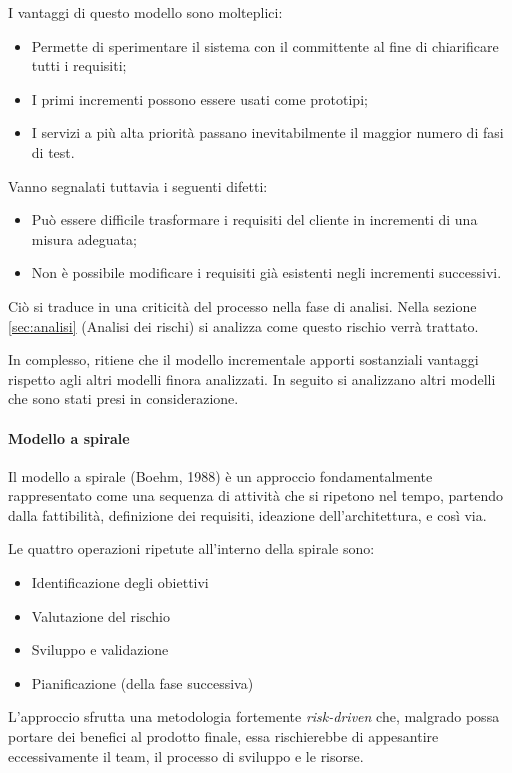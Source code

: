 I vantaggi di questo modello sono molteplici:
\begin{itemize}
\item Permette di sperimentare il sistema con il committente al fine di chiarificare tutti i requisiti;
\item I primi incrementi possono essere usati come prototipi;
\item I servizi a più alta priorità passano inevitabilmente il maggior numero di fasi di test.
\end{itemize}

Vanno segnalati tuttavia i seguenti difetti:
\begin{itemize}
\item Può essere difficile trasformare i requisiti del cliente in incrementi di una misura adeguata;
\item Non è possibile modificare i requisiti già esistenti negli incrementi successivi.
\end{itemize}

Ciò si traduce in una criticità del processo nella fase di analisi. Nella sezione {\ref{sec:analisi}} (Analisi dei rischi) si analizza come questo rischio verrà trattato.

In complesso, \hx{} ritiene che il modello incrementale apporti sostanziali vantaggi rispetto agli altri modelli finora analizzati. In seguito si analizzano altri modelli che sono stati presi in considerazione.

			\paragraph{Modello a spirale}
			Il modello a spirale (Boehm, 1988) è un approccio fondamentalmente rappresentato come una sequenza di attività che si ripetono nel tempo, partendo dalla fattibilità, definizione dei requisiti, ideazione dell'architettura, e così via.
			
			Le quattro operazioni ripetute all'interno della spirale sono:
\begin{itemize}
\item Identificazione degli obiettivi
\item Valutazione del rischio
\item Sviluppo e validazione
\item Pianificazione (della fase successiva)
\end{itemize}			 

L'approccio sfrutta una metodologia fortemente \emph{risk-driven} che, malgrado possa portare dei benefici al prodotto finale, essa rischierebbe di appesantire eccessivamente il team, il processo di sviluppo e le risorse.


